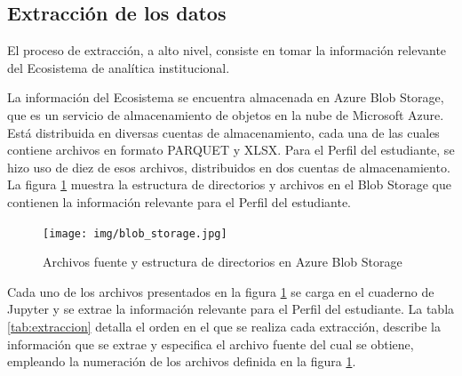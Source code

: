 \subsection{Extracción de los datos}
\label{subsec:extraccion}

El proceso de extracción, a alto nivel, consiste en tomar la información relevante del Ecosistema de analítica institucional.

La información del Ecosistema se encuentra almacenada en \gls{Azure Blob Storage}, que es un servicio de almacenamiento de objetos en la nube de Microsoft Azure. Está distribuida en diversas cuentas de almacenamiento, cada una de las cuales contiene archivos en formato PARQUET y XLSX. Para el Perfil del estudiante, se hizo uso de diez de esos archivos, distribuidos en dos cuentas de almacenamiento. La figura \ref{fig:blob_storage} muestra la estructura de directorios y archivos en el Blob Storage que contienen la información relevante para el Perfil del estudiante.

\begin{figure}[h]
	\centering
	\texttt{[image: img/blob\_storage.jpg]}
	\caption{Archivos fuente y estructura de directorios en \gls{Azure Blob Storage}}
	\label{fig:blob_storage}
\end{figure}

Cada uno de los archivos presentados en la figura \ref{fig:blob_storage} se carga en el cuaderno de \gls{Jupyter} y se extrae la información relevante para el Perfil del estudiante. La tabla \ref{tab:extraccion} detalla el orden en el que se realiza cada extracción, describe la información que se extrae y especifica el archivo fuente del cual se obtiene, empleando la numeración de los archivos definida en la figura \ref{fig:blob_storage}.

